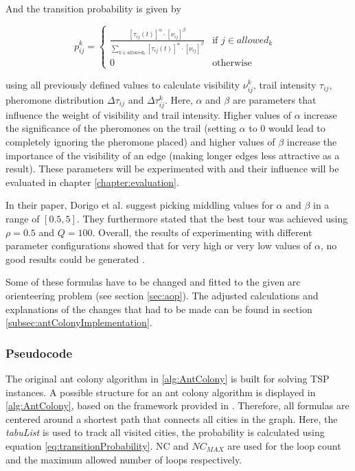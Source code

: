 And the transition probability is given by

\begin{equation}\label{eq:transitionProbability}
	p_{ij}^k = \begin{cases}
		\frac{[\tau_{ij}(t)]^{\alpha} \cdot [\nu_{ij}]^{\beta}}{\sum_{k \in allowed_k} [\tau_{ij}(t)]^{\alpha} \cdot [\nu_{ij}]^{\beta}} &\text{if $j \in allowed_k$ }\\
		0 &\text{otherwise}
	\end{cases}
\end{equation}

using all previously defined values to calculate visibility $\nu_{ij}^k$, trail intensity $\tau_{ij}$, pheromone distribution $\Delta\tau_{ij}$ and $\Delta\tau_{ij}^k$.
Here, $\alpha$ and $\beta$ are parameters that influence the weight of visibility and trail intensity.
Higher values of $\alpha$ increase the significance of the pheromones on the trail (setting $\alpha$ to 0 would lead to completely ignoring the pheromone placed) and higher values of $\beta$ increase the importance of the visibility of an edge (making longer edges less attractive as a result).
These parameters will be experimented with and their influence will be evaluated in chapter \ref{chapter:evaluation}.

In their paper, Dorigo et al. suggest picking middling values for $\alpha$ and $\beta$ in a range of $[0.5,5]$.
They furthermore stated that the best tour was achieved using $\rho = 0.5$ and $Q=100$.
Overall, the results of experimenting with different parameter configurations showed that for very high or very low values of $\alpha$, no good results could be generated .


Some of these formulas have to be changed and fitted to the given arc orienteering problem (see section \ref{sec:aop}). 
The adjusted calculations and explanations of the changes that had to be made can be found in section \ref{subsec:antColonyImplementation}.


\subsubsection{Pseudocode}
\label{subsubsec:antPseudocode}

The original ant colony algorithm in \ref{alg:AntColony} is built for solving TSP instances. 
A possible structure for an ant colony algorithm is displayed in \ref{alg:AntColony}, based on the framework provided in \cite{dorigo_ant_1996}.
Therefore, all formulas are centered around a shortest path that connects all cities in the graph.
Here, the \textit{tabuList} is used to track all visited cities, the probability is calculated using equation \ref{eq:transitionProbability}. 
NC and $NC_{MAX}$ are used for the loop count and the maximum allowed number of loops respectively.

